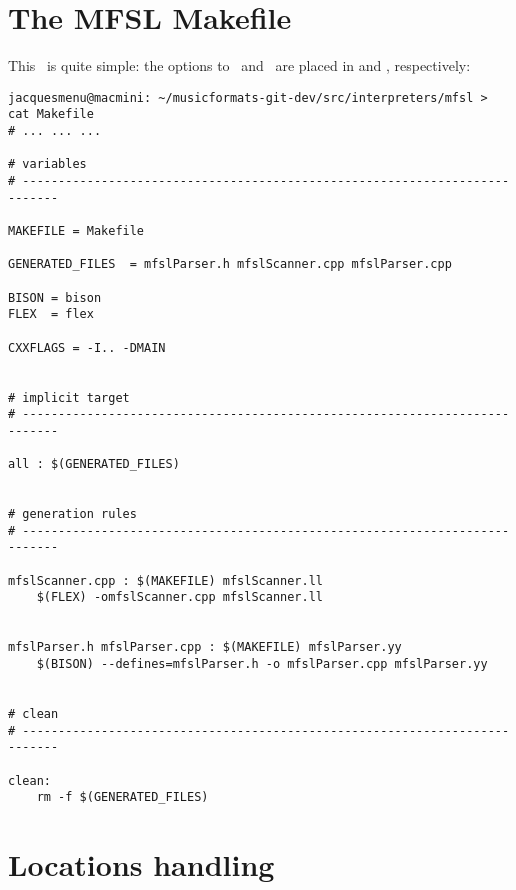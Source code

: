 

\section{The MFSL Makefile}\label{The MFSL Makefile}

This \Makefile\ is quite simple: the options to \flex\ and \bison\ are placed in  and , respectively:
\begin{lstlisting}[language=Terminal]
jacquesmenu@macmini: ~/musicformats-git-dev/src/interpreters/mfsl > cat Makefile
# ... ... ...

# variables
# ---------------------------------------------------------------------------

MAKEFILE = Makefile

GENERATED_FILES  = mfslParser.h mfslScanner.cpp mfslParser.cpp

BISON = bison
FLEX  = flex

CXXFLAGS = -I.. -DMAIN


# implicit target
# ---------------------------------------------------------------------------

all : $(GENERATED_FILES)


# generation rules
# ---------------------------------------------------------------------------

mfslScanner.cpp : $(MAKEFILE) mfslScanner.ll
	$(FLEX) -omfslScanner.cpp mfslScanner.ll


mfslParser.h mfslParser.cpp : $(MAKEFILE) mfslParser.yy
	$(BISON) --defines=mfslParser.h -o mfslParser.cpp mfslParser.yy


# clean
# ---------------------------------------------------------------------------

clean:
	rm -f $(GENERATED_FILES)
\end{lstlisting}


\section{Locations handling}\label{Locations handling}



